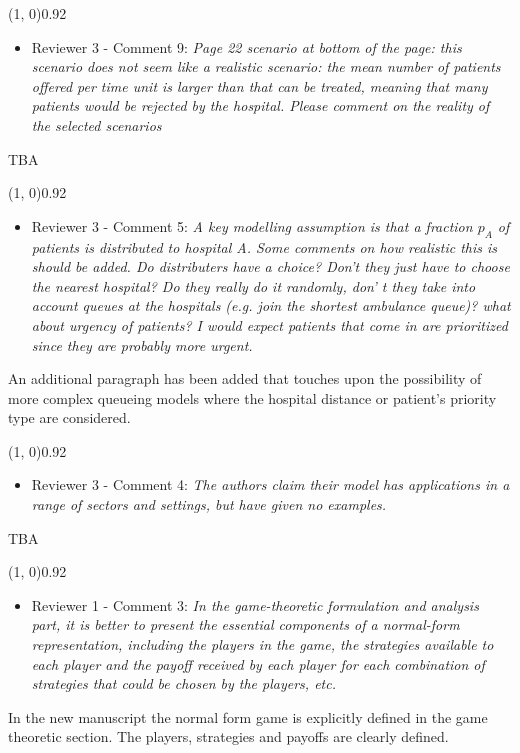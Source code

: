 \documentclass{article}
\begin{document}
    \line(1, 0){0.92\textwidth}
    \begin{itemize}
        \item Reviewer 3 - Comment 9: \textit{Page 22 scenario at bottom of
        the page: this scenario does not seem like a realistic scenario:
        the mean number of patients offered per time unit is larger than
        that can be treated, meaning that many patients would be rejected
        by the hospital. Please comment on the reality of the selected
        scenarios}
    \end{itemize}
    TBA %

    \line(1, 0){0.92\textwidth}
    \begin{itemize}
        \item Reviewer 3 - Comment 5: \textit{A key modelling assumption is
        that a fraction \(p_A\) of patients is distributed to hospital A.
        Some comments on how realistic this is should be added. Do
        distributers have a choice? Don't they just have to choose the
        nearest hospital? Do they really do it randomly, don' t they take
        into account queues at the hospitals (e.g. join the shortest
        ambulance queue)? what about urgency of patients? I would expect
        patients that come in are prioritized since they are probably more
        urgent.}
    \end{itemize}
    An additional paragraph has been added that touches upon the possibility of
    more complex queueing models where the hospital distance or patient's
    priority type are considered.

    \line(1, 0){0.92\textwidth}
    \begin{itemize}
        \item Reviewer 3 - Comment 4: \textit{The authors claim their model
        has applications in a range of sectors and settings, but have given
        no examples.}
    \end{itemize}
    TBA %

    \line(1, 0){0.92\textwidth}
    \begin{itemize}
        \item Reviewer 1 - Comment 3: \textit{In the game-theoretic
        formulation and analysis part, it is better to present the
        essential components of a normal-form representation, including the
        players in the game, the strategies available to each player and the
        payoff received by each player for each combination of strategies
        that could be chosen by the players, etc.}
    \end{itemize}
    In the new manuscript the normal form game is explicitly defined in the
    game theoretic section. The players, strategies and payoffs are clearly
    defined. 
\end{document}
